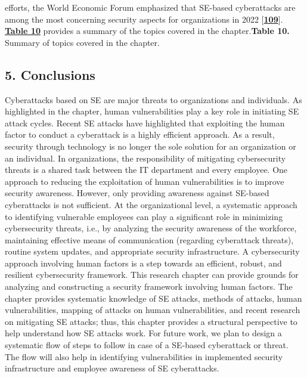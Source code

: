 {efforts, the World Economic Forum emphasized that SE-based cyberattacks are among the most concerning security aspects for organizations in 2022 [\href{https://www.mdpi.com/2076-3417/12/12/6042\#B109-applsci-12-06042}{\textbf{109}}]. \href{https://www.mdpi.com/2076-3417/12/12/6042\#table_body_display_applsci-12-06042-t010}{\textbf{Table 10}} provides a summary of the topics covered in the chapter.\textbf{Table 10.} Summary of topics covered in the chapter.

\subsection{\textbf{5. Conclusions}}

Cyberattacks based on SE are major threats to organizations and individuals. As highlighted in the chapter, human vulnerabilities play a key role in initiating SE attack cycles. Recent SE attacks have highlighted that exploiting the human factor to conduct a cyberattack is a highly efficient approach. As a result, security through technology is no longer the sole solution for an organization or an individual. In organizations, the responsibility of mitigating cybersecurity threats is a shared task between the IT department and every employee. One approach to reducing the exploitation of human vulnerabilities is to improve security awareness. However, only providing awareness against SE-based cyberattacks is not sufficient. At the organizational level, a systematic approach to identifying vulnerable employees can play a significant role in minimizing cybersecurity threats, i.e., by analyzing the security awareness of the workforce, maintaining effective means of communication (regarding cyberattack threats), routine system updates, and appropriate security infrastructure. A cybersecurity approach involving human factors is a step towards an efficient, robust, and resilient cybersecurity framework. This research chapter can provide grounds for analyzing and constructing a security framework involving human factors. The chapter provides systematic knowledge of SE attacks, methods of attacks, human vulnerabilities, mapping of attacks on human vulnerabilities, and recent research on mitigating SE attacks; thus, this chapter provides a structural perspective to help understand how SE attacks work. For future work, we plan to design a systematic flow of steps to follow in case of a SE-based cyberattack or threat. The flow will also help in identifying vulnerabilities in implemented security infrastructure and employee awareness of SE cyberattacks. 

}
